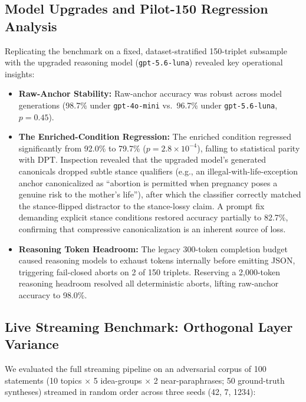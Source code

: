 \documentclass{article}
\begin{document}
\subsection{Model Upgrades and Pilot-150 Regression Analysis}

Replicating the benchmark on a fixed, dataset-stratified 150-triplet subsample with the upgraded reasoning model (\texttt{gpt-5.6-luna}) revealed key operational insights:

\begin{itemize}
\item \textbf{Raw-Anchor Stability:} Raw-anchor accuracy was robust across model generations (98.7\% under \texttt{gpt-4o-mini} vs.\ 96.7\% under \texttt{gpt-5.6-luna}, $p = 0.45$).
\item \textbf{The Enriched-Condition Regression:} The enriched condition regressed significantly from 92.0\% to 79.7\% ($p = 2.8 \times 10^{-4}$), falling to statistical parity with DPT. Inspection revealed that the upgraded model's generated canonicals dropped subtle stance qualifiers (e.g., an illegal-with-life-exception anchor canonicalized as ``abortion is permitted when pregnancy poses a genuine risk to the mother's life''), after which the classifier correctly matched the stance-flipped distractor to the stance-lossy claim. A prompt fix demanding explicit stance conditions restored accuracy partially to 82.7\%, confirming that compressive canonicalization is an inherent source of loss.
\item \textbf{Reasoning Token Headroom:} The legacy 300-token completion budget caused reasoning models to exhaust tokens internally before emitting JSON, triggering fail-closed aborts on 2 of 150 triplets. Reserving a 2,000-token reasoning headroom resolved all deterministic aborts, lifting raw-anchor accuracy to 98.0\%.
\end{itemize}

\subsection{Live Streaming Benchmark: Orthogonal Layer Variance}

We evaluated the full streaming pipeline on an adversarial corpus of 100 statements (10 topics $\times$ 5 idea-groups $\times$ 2 near-paraphrases; 50 ground-truth syntheses) streamed in random order across three seeds (42, 7, 1234):
\end{document}
